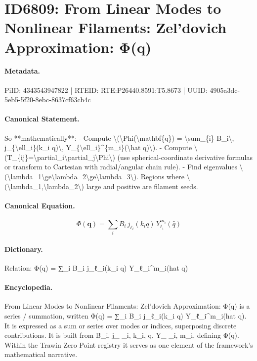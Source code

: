\section*{ID6809: From Linear Modes to Nonlinear Filaments: Zel’dovich Approximation: Φ(q)}
\paragraph{Metadata.}
PiID: 4343543947822 | RTEID: RTE:P26440.8591:T5.8673 | UUID: 4905a3dc-5eb5-5f20-8ebc-8637cf63cb4c

\paragraph{Canonical Statement.}
So **mathematically**: - Compute \textbackslash{}(\textbackslash{}Phi(\textbackslash{}mathbf\{q\}) = \textbackslash{}sum\_\{i\} B\_i\textbackslash{}, j\_\{\textbackslash{}ell\_i\}(k\_i q)\textbackslash{}, Y\_\{\textbackslash{}ell\_i\}\textasciicircum{}\{m\_i\}(\textbackslash{}hat q)\textbackslash{}). - Compute \textbackslash{}(T\_\{ij\}=\textbackslash{}partial\_i\textbackslash{}partial\_j\textbackslash{}Phi\textbackslash{}) (use spherical-coordinate derivative formulas or transform to Cartesian with radial/angular chain rule). - Find eigenvalues \textbackslash{}(\textbackslash{}lambda\_1\textbackslash{}ge\textbackslash{}lambda\_2\textbackslash{}ge\textbackslash{}lambda\_3\textbackslash{}). Regions where \textbackslash{}(\textbackslash{}lambda\_1,\textbackslash{}lambda\_2\textbackslash{}) large and positive are filament seeds.

\paragraph{Canonical Equation.}
\[
\Phi(\mathbf{q}) = \sum_{i} B_i\, j_{\ell_i}(k_i q)\, Y_{\ell_i}^{m_i}(\hat q)
\]

\paragraph{Dictionary.}
Relation: Φ(q) = ∑\_i B\_i j\_ℓ\_i(k\_i q) Y\_ℓ\_i\textasciicircum{}m\_i(hat q)

\paragraph{Encyclopedia.}
From Linear Modes to Nonlinear Filaments: Zel’dovich Approximation: Φ(q) is a series / summation, written Φ(q) = ∑\_i B\_i j\_ℓ\_i(k\_i q) Y\_ℓ\_i\textasciicircum{}m\_i(hat q). It is expressed as a sum or series over modes or indices, superposing discrete contributions. It is built from B\_i, j\_ \_i, k\_i, q, Y\_ \_i, m\_i, defining Φ(q). Within the Trawin Zero Point registry it serves as one element of the framework's mathematical narrative.
